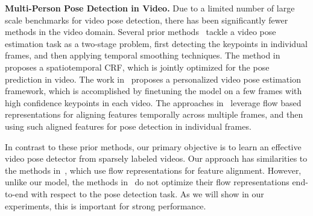 \documentclass{article}
\begin{document}
\textbf{Multi-Person Pose Detection in Video.} Due to a limited number of large scale benchmarks for video pose detection, there has been significantly fewer methods in the video domain. Several prior methods~\cite{ Iqbal_CVPR2017,insafutdinov2017, girdhar2018detecttrack} tackle a video pose estimation task as a two-stage problem, first detecting the keypoints in individual frames, and then applying temporal smoothing techniques. The method in~\cite{SongWVH17} proposes a spatiotemporal CRF, which is jointly optimized for the pose prediction in video. The work in~\cite{Charles16} proposes a personalized video pose estimation framework, which is accomplished by finetuning the model on a few frames with high confidence keypoints in each video. The approaches in~\cite{Pfister15a, Zhang_2018_CVPR} leverage flow based representations for aligning features temporally across multiple frames, and then using such aligned features for pose detection in individual frames.



In contrast to these prior methods, our primary objective is to learn an effective video pose detector from sparsely labeled videos. Our approach has similarities to the methods in~\cite{Pfister15a, Zhang_2018_CVPR}, which use flow representations for feature alignment. However, unlike our model, the methods in~\cite{Pfister15a, Zhang_2018_CVPR} do not optimize their flow representations end-to-end with respect to the pose detection task. As we will show in our experiments, this is important for strong performance. 
\end{document}
